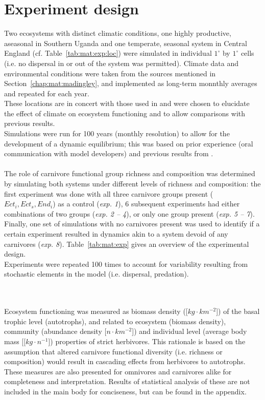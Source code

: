 \section{Experiment design}
\label{chap:mat:exp}
Two ecosystems with distinct climatic conditions, one highly productive, aseasonal in Southern Uganda and one temperate, seasonal system in Central England (cf. Table~\ref{tab:mat:exp:loc}) were simulated in individual $1^\circ$ by $1^\circ$ cells (i.e. no dispersal in or out of the system was permitted). 
Climate data and environmental conditions were taken from the sources mentioned in Section~\ref{chap:mat:madingley}, and implemented as long-term monnthly averages and repeated for each year.\\

These locations are in concert with those used in \citet{Harfoot2014} and were chosen to elucidate the effect of climate on ecosystem functioning and to allow comparisons with previous results. 
\\
Simulations were run for 100 years (monthly resolution) to allow for the development of a dynamic equilibrium; 
this was based on prior experience (oral communication with model developers) and previous results from \cite{Harfoot2014}.
\\\\
The role of carnivore functional group richness and composition was determined by simulating both systems under different levels of richness and composition: 
the first experiment was done with all three carnivore groups present ($Ect_i, Ect_s, End_i$) as a control (\textit{exp. 1}), 6 subsequent experiments had either combinations of two groups (\textit{exp. 2 -- 4}), or only one group present (\textit{exp. 5 -- 7}). 
Finally, one set of simulations with no carnivores present was used to identify if a certain experiment resulted in dynamics akin to a system devoid of any carnivores (\textit{exp. 8}). Table~\ref{tab:mat:exp} gives an overview of the experimental design. \\
Experiments were repeated 100 times to account for variability resulting from stochastic elements in the model (i.e. dispersal, predation).

\\\\
Ecosystem functioning was measured as biomass density ([$kg\cdot km^{-2}$]) of the basal trophic level (autotrophs), and related to ecosystem (biomass density), community (abundance density [$n\cdot km^{-2}$]) and individual level (average body mass [[$kg\cdot n^{-1}$]) properties of strict herbivores. This rationale is based on the assumption that altered carnivore functional diversity (i.e. richness or composition) would result in cascading effects from herbivores to autotrophs. These measures are also presented for omnivores and carnivores alike for completeness and interpretation. Results of statistical analysis of these are not included in the main body for conciseness, but can be found in the appendix.
%
